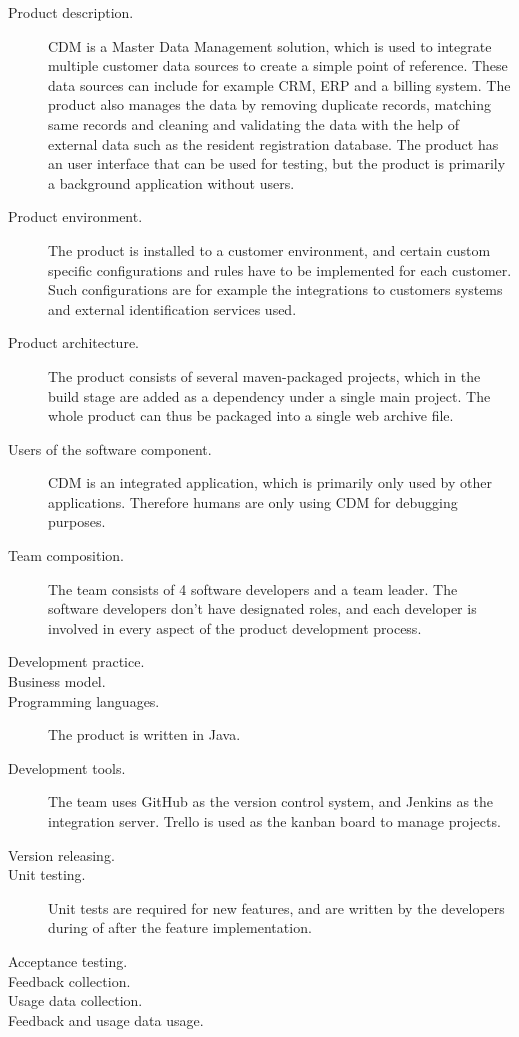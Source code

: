 \documentclass[english]{tktltiki2}
\theoremstyle{definition}
\theoremstyle{remark}
\begin{document}
\begin{description}
  \item[Product description.] CDM is a Master Data Management \cite{loshin2010master} solution, which is used to integrate multiple customer data sources to create a simple point of reference. These data sources can include for example CRM, ERP and a billing system. The product also manages the data by removing duplicate records, matching same records and cleaning and validating the data with the help of external data such as the resident registration database. The product has an user interface that can be used for testing, but the product is primarily a background application without users. 
  \item[Product environment.] The product is installed to a customer environment, and certain custom specific configurations and rules have to be implemented for each customer. Such configurations are for example the integrations to customers systems and external identification services used. 
  \item[Product architecture.] The product consists of several maven-packaged projects, which in the build stage are added as a dependency under a single main project. The whole product can thus be packaged into a single web archive file.
  \item[Users of the software component.] CDM is an integrated application, which is primarily only used by other applications. Therefore humans are only using CDM for debugging purposes.
  \item[Team composition.] The team consists of 4 software developers and a team leader. The software developers don't have designated roles, and each developer is involved in every aspect of the product development process.
  \item[Development practice.] 
  \item[Business model.] 
  \item[Programming languages.] The product is written in Java.
  \item[Development tools.] The team uses GitHub as the version control system, and Jenkins as the integration server. Trello is used as the kanban board to manage projects. 
  \item[Version releasing.]
  \item[Unit testing.] Unit tests are required for new features, and are written by the developers during of after the feature implementation.
  \item[Acceptance testing.] 
  \item[Feedback collection.]
  \item[Usage data collection.]
  \item[Feedback and usage data usage.]
\end{description}
\end{document}
